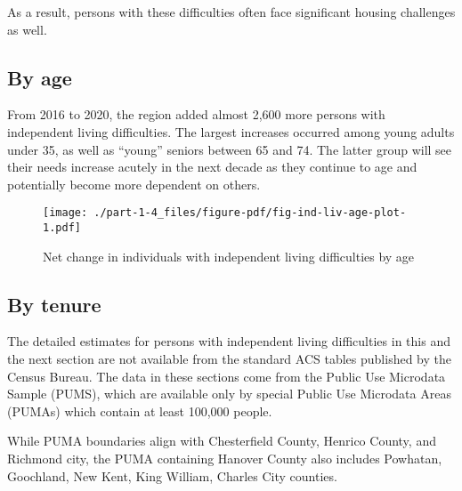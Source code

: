 \documentclass[
  letterpaper,
  DIV=11,
  numbers=noendperiod]{scrreprt}
\begin{document}
As a result, persons with these difficulties often face significant
housing challenges as well.

\hypertarget{by-age}{%
\subsection{By age}\label{by-age}}

From 2016 to 2020, the region added almost 2,600 more persons with
independent living difficulties. The largest increases occurred among
young adults under 35, as well as ``young'' seniors between 65 and 74.
The latter group will see their needs increase acutely in the next
decade as they continue to age and potentially become more dependent on
others.

\begin{figure}

{\centering \texttt{[image: ./part-1-4\_files/figure-pdf/fig-ind-liv-age-plot-1.pdf]}

}

\caption{\label{fig-ind-liv-age-plot}Net change in individuals with
independent living difficulties by age}

\end{figure}

\hypertarget{by-tenure}{%
\subsection{By tenure}\label{by-tenure}}

\begin{tcolorbox}[enhanced jigsaw, colframe=quarto-callout-note-color-frame, arc=.35mm, bottomrule=.15mm, colbacktitle=quarto-callout-note-color!10!white, opacityback=0, left=2mm, rightrule=.15mm, title=\textcolor{quarto-callout-note-color}{\faInfo}\hspace{0.5em}{Note}, colback=white, coltitle=black, toptitle=1mm, leftrule=.75mm, titlerule=0mm, breakable, opacitybacktitle=0.6, toprule=.15mm, bottomtitle=1mm]

The detailed estimates for persons with independent living difficulties
in this and the next section are not available from the standard ACS
tables published by the Census Bureau. The data in these sections come
from the Public Use Microdata Sample (PUMS), which are available only by
special Public Use Microdata Areas (PUMAs) which contain at least
100,000 people.

While PUMA boundaries align with Chesterfield County, Henrico County,
and Richmond city, the PUMA containing Hanover County also includes
Powhatan, Goochland, New Kent, King William, Charles City counties.

\end{tcolorbox}
\end{document}
